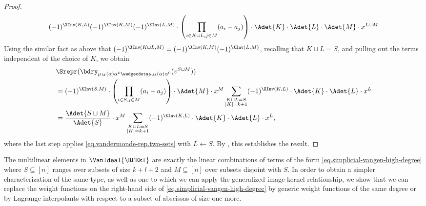\documentclass{toc}
\begin{document}
\begin{proof}
\[ (-1)^{\XInv(K,L)} (-1)^{\XInv(K,M)} (-1)^{\XInv(L,M)} \cdot \left( \prod_{i\in K \sqcup L, j \in M} (a_i-a_j) \right)  \cdot \Adet{K} \cdot \Adet{L} \cdot \Adet{M} \cdot x^{L \sqcup M} \]
Using the similar fact as above that  
$(-1)^{\XInv(K \sqcup L,M)} = (-1)^{\XInv(K,M)} (-1)^{\XInv(L,M)}$, recalling that $K \sqcup L = S$, and pulling out the terms independent of the choice of $K$, we obtain
\begin{align*}
&\Srepr(\bdry_{\mu_M(\alpha)\alpha^k\wedgecdots \mu_M(\alpha)\alpha^0}(v^{S \sqcup M})) \\
&= (-1)^{\XInv(S,M)} \cdot \left( \prod_{i\in S, j \in M} (a_i-a_j) \right)
\cdot \Adet{M} \cdot x^M \sum_{\substack{K\sqcup L=S\\ |K|=k+1}} (-1)^{\XInv(K,L)} \cdot \Adet{K} \cdot \Adet{L} \cdot x^L \\
%
&= \frac{\Adet{S \sqcup M}}{\Adet{S}} \cdot x^M \sum_{\substack{K\sqcup L=S\\ |K|=k+1}} (-1)^{\XInv(K,L)} \cdot \Adet{K} \cdot \Adet{L} \cdot x^L,
\end{align*}
where the last step applies \eqref{eq.vandermonde-rep.two-sets} with $L \gets S$. By , this establishes the result.
\end{proof}

The multilinear elements in \(\VanIdeal{\RFEkl}\) are exactly the linear combinations of terms of the form \eqref{eq.simplicial-vangen-high-degree} where $S \subseteq [n]$ ranges over subsets of size $k+l+2$ and $M \subseteq [n]$ over subsets disjoint with $S$. In order to obtain a simpler characterization of the same type, as well as one to which we can apply the generalized image-kernel relationship, we show that we can replace the weight functions on the right-hand side of \eqref{eq.simplicial-vangen-high-degree} by generic weight functions of the same degree or by Lagrange interpolants with respect to a subset of abscissas of size one more. 
\end{document}
